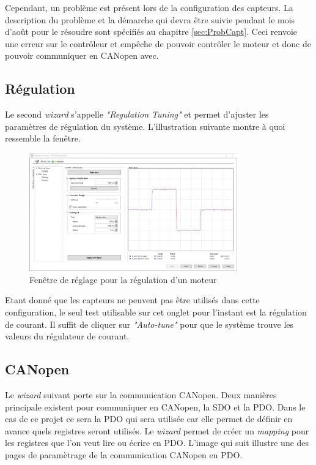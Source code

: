 Cependant, un problème est présent lors de la configuration des capteurs. La description du problème et la démarche qui devra être suivie pendant
le mois d'août pour le résoudre sont spécifiés au chapitre \ref{sec:ProbCapt}. Ceci renvoie une erreur sur le contrôleur et empêche de pouvoir
contrôler le moteur et donc de pouvoir communiquer en CANopen avec.\\

\subsection{Régulation}\label{subsec:InitRegul}
Le second \textit{\gls{wizard}} s'appelle \textit{"Regulation Tuning"} et permet d'ajuster les paramètres de régulation du système. L'illustration
suivante montre à quoi ressemble la fenêtre.

\begin{figure}[H]
    \centering
    \includegraphics[width = 0.8\textwidth]{assets/figures/RegulationTuning.png}
    \caption{Fenêtre de réglage pour la régulation d'un moteur}
    \label{fig:RegTune}
\end{figure}

Etant donné que les capteurs ne peuvent pas être utilisés dans cette configuration, le seul test utilisable sur cet onglet pour l'instant
est la régulation de courant. Il suffit de cliquer sur \textit{"Auto-tune"} pour que le système trouve les valeurs du régulateur de courant.\\

\subsection{CANopen}
Le \textit{\gls{wizard}} suivant porte sur la communication CANopen. Deux manières principale existent pour communiquer en CANopen, la SDO et la PDO.
Dans le cas de ce projet ce sera la PDO qui sera utilisée car elle permet de définir en avance quels registres seront utilisés. Le \textit{\gls{wizard}}
permet de créer un \textit{mapping} pour les registres que l'on veut lire ou écrire en PDO. L'image qui suit illustre une des pages de paramètrage de la
communication CANopen en PDO.

